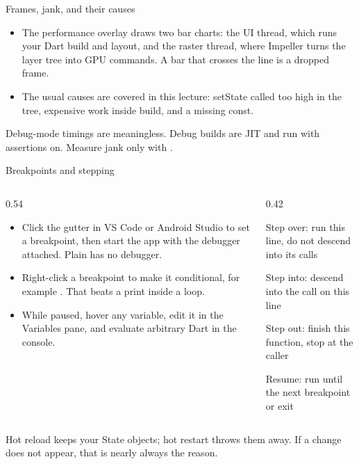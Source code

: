\documentclass[10pt,aspectratio=169,t]{beamer}
\begin{document}
\begin{frame}[eyebrow=Debugging]{Frames, jank, and their causes}
  \vskip 2mm
  \begin{itemize}
    \item The performance overlay draws two bar charts: the UI thread, which runs your Dart build and layout, and the raster thread, where Impeller turns the layer tree into GPU commands. A bar that crosses the line is a dropped frame.
    \item The usual causes are covered in this lecture: setState called too high in the tree, expensive work inside build, and a missing const.
  \end{itemize}
  \vskip 3mm
  \begin{takeaway}{Debug-mode timings are meaningless.}
    Debug builds are JIT and run with assertions on. Measure jank only with .
  \end{takeaway}
\end{frame}

\begin{frame}[eyebrow=Debugging]{Breakpoints and stepping}
  \begin{columns}[T]
    \begin{column}{0.54\textwidth}
      \begin{itemize}
        \item Click the gutter in VS Code or Android Studio to set a breakpoint, then start the app with the debugger attached. Plain  has no debugger.
        \item Right-click a breakpoint to make it conditional, for example . That beats a print inside a loop.
        \item While paused, hover any variable, edit it in the Variables pane, and evaluate arbitrary Dart in the console.
      \end{itemize}
    \end{column}
    \begin{column}{0.42\textwidth}
      \begin{steps}
        \item Step over: run this line, do not descend into its calls
        \item Step into: descend into the call on this line
        \item Step out: finish this function, stop at the caller
        \item Resume: run until the next breakpoint or exit
      \end{steps}
    \end{column}
  \end{columns}
  \begin{takeaway}{Hot reload keeps your State objects; hot restart throws them away.}
    If a change does not appear, that is nearly always the reason.
  \end{takeaway}
\end{frame}
\end{document}

